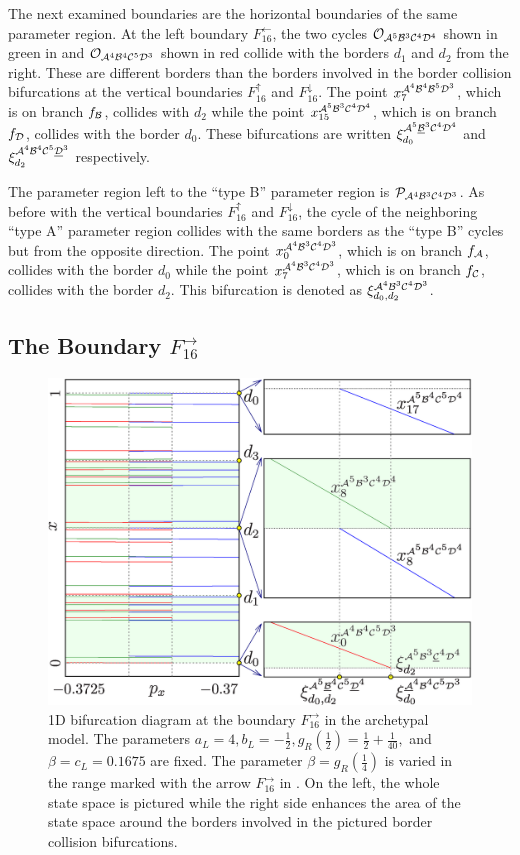 The next examined boundaries are the horizontal boundaries of the same parameter region.
At the left boundary $F_{16}^\leftarrow$, the two cycles $\mathcal{O}_{\mathcal{A}^5\mathcal{B}^3\mathcal{C}^4\mathcal{D}^4}$ shown in green in  and $\mathcal{O}_{\mathcal{A}^4\mathcal{B}^4\mathcal{C}^5\mathcal{D}^3}$ shown in red collide with the borders $d_1$ and $d_2$ from the right.
These are different borders than the borders involved in the border collision bifurcations at the vertical boundaries $F_{16}^\uparrow$ and $F_{16}^\downarrow$.
The point $x_{7}^{\mathcal{A}^4\mathcal{B}^4\mathcal{B}^5\mathcal{D}^3}$, which is on branch $f_{\mathcal{B}}$, collides with $d_2$ while the point $x_{15}^{\mathcal{A}^5\mathcal{B}^3\mathcal{C}^4\mathcal{D}^4}$, which is on branch $f_{\mathcal{D}}$, collides with the border $d_0$.
These bifurcations are written $\xi_{d_0}^{\mathcal{A}^5\underline{\mathcal{B}}^3\mathcal{C}^4\mathcal{D}^4}$ and $\xi_{d_2}^{\mathcal{A}^4\mathcal{B}^4\mathcal{C}^5\underline{\mathcal{D}}^3}$ respectively.

The parameter region left to the ``type B'' parameter region is $\mathcal{P}_{\mathcal{A}^4\mathcal{B}^3\mathcal{C}^4\mathcal{D}^3}$.
As before with the vertical boundaries $F_{16}^\uparrow$ and $F_{16}^\downarrow$, the cycle of the neighboring ``type A'' parameter region collides with the same borders as the ``type B'' cycles but from the opposite direction.
The point $x_{0}^{\mathcal{A}^4\mathcal{B}^3\mathcal{C}^4\mathcal{D}^3}$, which is on branch $f_{\mathcal{A}}$, collides with the border $d_0$ while the point $x_{7}^{\mathcal{A}^4\mathcal{B}^3\mathcal{C}^4\mathcal{D}^3}$, which is on branch $f_{\mathcal{C}}$, collides with the border $d_2$.
This bifurcation is denoted as $\xi_{d_0, d_2}^{\mathcal{A}^4\mathcal{B}^3\mathcal{C}^4\mathcal{D}^3}$.

\subsection{The Boundary $F_{16}^\rightarrow$}
\label{sec:arch.bif.R}

\begin{figure}
	\centering
	\includegraphics[width=.7 \textwidth]{../Figures/6/6.9/result.png}
	\caption[1D bifurcation diagram at the boundary $F_{16}^\rightarrow$ in the archetypal model]{
		1D bifurcation diagram at the boundary $F_{16}^\rightarrow$ in the archetypal model.
		The parameters $a_L = 4, b_L = -\frac{1}{2}, g_R\left(\frac{1}{2}\right) = \frac{1}{2} + \frac{1}{40},$ and $\beta = c_L = 0.1675$ are fixed.
		The parameter $\beta = g_R\left(\frac{1}{4}\right)$ is varied in the range marked with the arrow $F_{16}^\rightarrow$ in .
		On the left, the whole state space is pictured while the right side enhances the area of the state space around the borders involved in the pictured border collision bifurcations.
	}
	\label{fig:arch.bif.F.right}
\end{figure}

